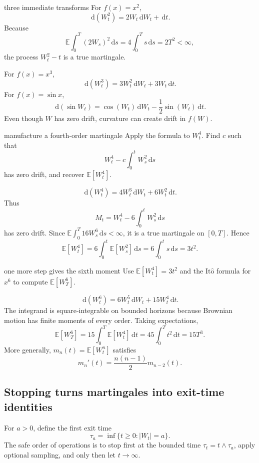 \documentclass[10pt]{article}
\newcommand{\E}{\mathbb E}
\newcommand{\1}{\mathbf 1}
\newcommand{\dd}{\,\mathrm d}
\newcommand{\Ito}{\mathrm{It\hat{o}}}
\theoremstyle{definition}
\begin{document}
\begin{boardexample}{three immediate transforms}
For \(f(x)=x^2\),
\[
\dd(W_t^2)=2W_t\dd W_t+\dd t.
\]
Because
\[
\E\int_0^T(2W_s)^2\dd s
=4\int_0^T s\dd s=2T^2<\infty,
\]
the process \(W_t^2-t\) is a true martingale.

For \(f(x)=x^3\),
\[
\dd(W_t^3)=3W_t^2\dd W_t+3W_t\dd t.
\]
For \(f(x)=\sin x\),
\[
\dd(\sin W_t)
=\cos(W_t)\dd W_t-\frac12\sin(W_t)\dd t.
\]
Even though \(W\) has zero drift, curvature can create drift in \(f(W)\).
\end{boardexample}

\begin{studentexercise}{manufacture a fourth-order martingale}
Apply the formula to \(W_t^4\). Find \(c\) such that
\[
W_t^4-c\int_0^tW_s^2\dd s
\]
has zero drift, and recover \(\E[W_t^4]\).
\end{studentexercise}
\begin{shortsolution}
\[
\dd(W_t^4)=4W_t^3\dd W_t+6W_t^2\dd t.
\]
Thus
\[
M_t=W_t^4-6\int_0^tW_s^2\dd s
\]
has zero drift. Since
\(\E\int_0^T16W_s^6\dd s<\infty\), it is a true martingale on
\([0,T]\). Hence
\[
\E[W_t^4]
=6\int_0^t\E[W_s^2]\dd s
=6\int_0^t s\dd s
=3t^2.
\]
\end{shortsolution}

\begin{studentexercise}{one more step gives the sixth moment}
Use \(\E[W_t^4]=3t^2\) and the \(\Ito\) formula for \(x^6\) to compute
\(\E[W_T^6]\).
\end{studentexercise}
\begin{shortsolution}
\[
\dd(W_t^6)=6W_t^5\dd W_t+15W_t^4\dd t.
\]
The integrand is square-integrable on bounded horizons because Brownian
motion has finite moments of every order. Taking expectations,
\[
\boxed{
\E[W_T^6]
=15\int_0^T\E[W_t^4]\dd t
=45\int_0^Tt^2\dd t
=15T^3.}
\]
More generally, \(m_n(t)=\E[W_t^n]\) satisfies
\[
m_n'(t)=\frac{n(n-1)}2m_{n-2}(t).
\]
\end{shortsolution}

\subsection{Stopping turns martingales into exit-time identities}

For \(a>0\), define the first exit time
\[
\tau_a=\inf\{t\geq0:|W_t|=a\}.
\]
The safe order of operations is to stop first at the bounded time
\(\tau_t=t\wedge\tau_a\), apply optional sampling, and only then let
\(t\to\infty\).
\end{document}
